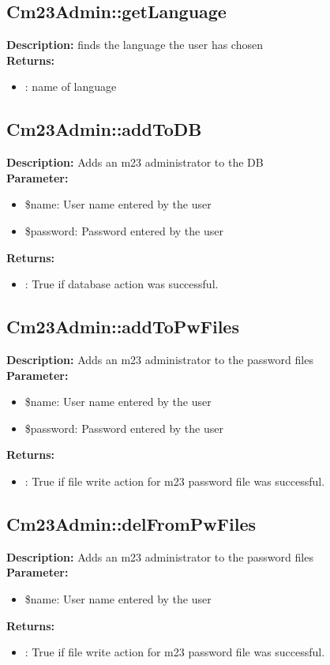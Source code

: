 \subsection{Cm23Admin::getLanguage}
\textbf{Description:} finds the language the user has chosen\\
\textbf{Returns:}
\begin{itemize}
\item : name of language
\end{itemize}

\subsection{Cm23Admin::addToDB}
\textbf{Description:} Adds an m23 administrator to the DB\\
\textbf{Parameter:}
\begin{itemize}
\item \$name: User name entered by the user
\item \$password: Password entered by the user
\end{itemize}
\textbf{Returns:}
\begin{itemize}
\item : True if database action was successful.
\end{itemize}

\subsection{Cm23Admin::addToPwFiles}
\textbf{Description:} Adds an m23 administrator to the password files\\
\textbf{Parameter:}
\begin{itemize}
\item \$name: User name entered by the user
\item \$password: Password entered by the user
\end{itemize}
\textbf{Returns:}
\begin{itemize}
\item : True if file write action for m23 password file was successful.
\end{itemize}

\subsection{Cm23Admin::delFromPwFiles}
\textbf{Description:} Adds an m23 administrator to the password files\\
\textbf{Parameter:}
\begin{itemize}
\item \$name: User name entered by the user
\end{itemize}
\textbf{Returns:}
\begin{itemize}
\item : True if file write action for m23 password file was successful.
\end{itemize}

